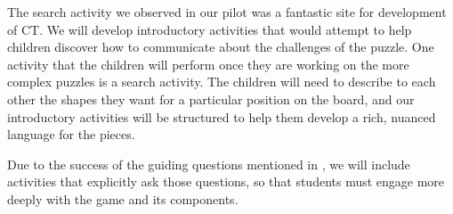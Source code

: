\documentclass{acm_proc_article-sp}
\begin{document}
The search activity we observed in our pilot was a fantastic site for development of CT. 
We will develop introductory activities that would attempt to help children discover how to communicate about the challenges of the puzzle. 
One activity that the children will perform once they are working on the more complex puzzles is a search activity. 
The children will need to describe to each other the shapes they want for a particular position on the board, and our introductory activities will be structured to help them develop a rich, nuanced language for the pieces.

Due to the success of the guiding questions mentioned in {\em \hyperref[sec:observations]{}}, we will include activities that explicitly ask  those questions, so that students must engage more deeply with the game and its components.
\end{document}
